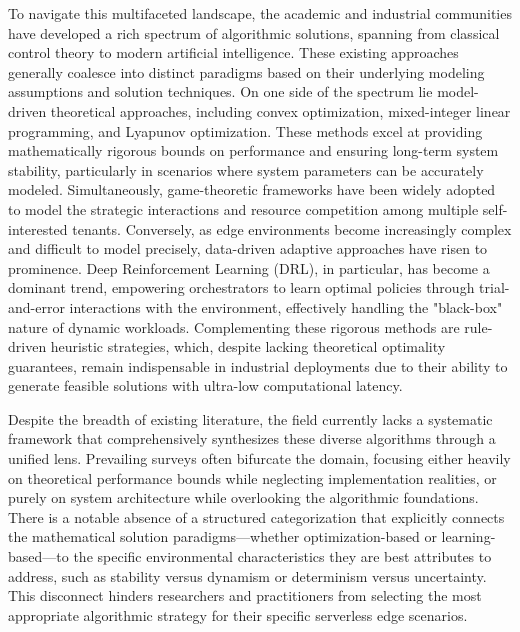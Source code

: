 \documentclass[lettersize,journal]{IEEEtran}
\begin{document}
To navigate this multifaceted landscape, the academic and industrial communities have developed a rich spectrum of algorithmic solutions, spanning from classical control theory to modern artificial intelligence. These existing approaches generally coalesce into distinct paradigms based on their underlying modeling assumptions and solution techniques. On one side of the spectrum lie model-driven theoretical approaches, including convex optimization, mixed-integer linear programming, and Lyapunov optimization. These methods excel at providing mathematically rigorous bounds on performance and ensuring long-term system stability, particularly in scenarios where system parameters can be accurately modeled. Simultaneously, game-theoretic frameworks have been widely adopted to model the strategic interactions and resource competition among multiple self-interested tenants. Conversely, as edge environments become increasingly complex and difficult to model precisely, data-driven adaptive approaches have risen to prominence. Deep Reinforcement Learning (DRL), in particular, has become a dominant trend, empowering orchestrators to learn optimal policies through trial-and-error interactions with the environment, effectively handling the "black-box" nature of dynamic workloads. Complementing these rigorous methods are rule-driven heuristic strategies, which, despite lacking theoretical optimality guarantees, remain indispensable in industrial deployments due to their ability to generate feasible solutions with ultra-low computational latency.

Despite the breadth of existing literature, the field currently lacks a systematic framework that comprehensively synthesizes these diverse algorithms through a unified lens. Prevailing surveys often bifurcate the domain, focusing either heavily on theoretical performance bounds while neglecting implementation realities, or purely on system architecture while overlooking the algorithmic foundations. There is a notable absence of a structured categorization that explicitly connects the mathematical solution paradigms—whether optimization-based or learning-based—to the specific environmental characteristics they are best attributes to address, such as stability versus dynamism or determinism versus uncertainty. This disconnect hinders researchers and practitioners from selecting the most appropriate algorithmic strategy for their specific serverless edge scenarios.
\end{document}
